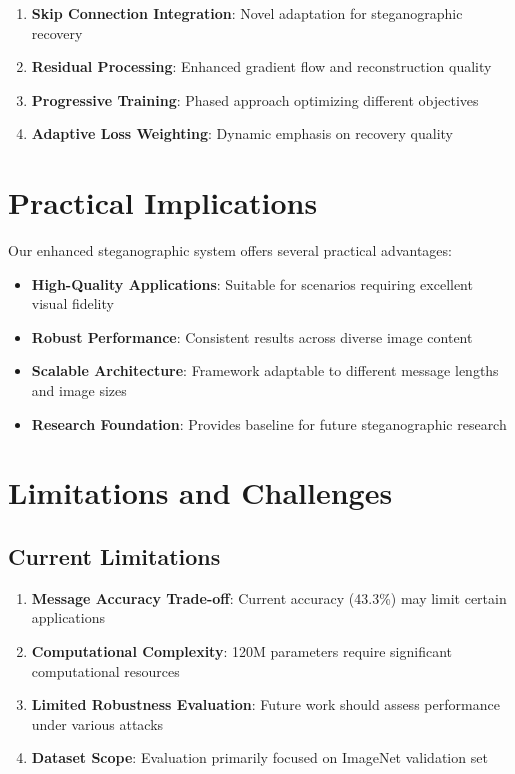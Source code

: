 \documentclass[12pt,a4paper]{report}
\begin{document}
\begin{enumerate}
    \item \textbf{Skip Connection Integration}: Novel adaptation for steganographic recovery
    \item \textbf{Residual Processing}: Enhanced gradient flow and reconstruction quality
    \item \textbf{Progressive Training}: Phased approach optimizing different objectives
    \item \textbf{Adaptive Loss Weighting}: Dynamic emphasis on recovery quality
\end{enumerate}

\section{Practical Implications}

Our enhanced steganographic system offers several practical advantages:

\begin{itemize}
    \item \textbf{High-Quality Applications}: Suitable for scenarios requiring excellent visual fidelity
    \item \textbf{Robust Performance}: Consistent results across diverse image content
    \item \textbf{Scalable Architecture}: Framework adaptable to different message lengths and image sizes
    \item \textbf{Research Foundation}: Provides baseline for future steganographic research
\end{itemize}

\section{Limitations and Challenges}

\subsection{Current Limitations}

\begin{enumerate}
    \item \textbf{Message Accuracy Trade-off}: Current accuracy (43.3\%) may limit certain applications
    \item \textbf{Computational Complexity}: 120M parameters require significant computational resources
    \item \textbf{Limited Robustness Evaluation}: Future work should assess performance under various attacks
    \item \textbf{Dataset Scope}: Evaluation primarily focused on ImageNet validation set
\end{enumerate}
\end{document}
